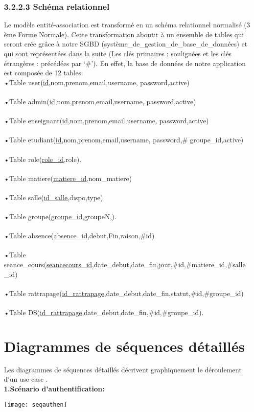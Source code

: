\documentclass[a4paper,12pt,oneside]{report}
\begin{document}
\subsubsection{3.2.2.3 Schéma relationnel}
Le modèle entité-association est transformé en un schéma relationnel normalisé (3 ème Forme Normale).
Cette transformation aboutit à un ensemble de tables qui seront crée grâce à notre SGBD (système\_de\_gestion\_de\_base\_de\_données) et qui sont représentées dans la suite (Les clés primaires : soulignées et les clés étrangères : précédées par ‘\#’). En effet, la base de données de notre application est composée de 12 tables:
\\
•Table user(\underline{id},nom,prenom,email,username, 
password,active)\\
\\
•Table admin(\underline{id},nom,prenom,email,username, 
password,active)\\
\\
•Table enseignant(\underline{id},nom,prenom,email,username, 
password,active)\\
\\
•Table etudiant(\underline{id},nom,prenom,email,username, 
password,\# groupe\_id,active) \\
\\
•Table role(\underline{role\_id},role).\\ \\
•Table matiere(\underline{matiere\_id},nom\_matiere)\\
\\
•Table salle(\underline{id\_salle},dispo,type)\\
\\
•Table groupe(\underline{groupe\_id},groupeN,).\\
\\
•Table absence(\underline{absence\_id},debut,Fin,raison,\#id)\\
\\
•Table seance\_cours(\underline{seancecours\_id},date\_debut,date\_fin,jour,\#id,\#matiere\_id,\#salle\_id)\\
\\
•Table rattrapage(\underline{id\_rattrapage},date\_debut,date\_fin,statut,\#id,\#groupe\_id)\\
\\
•Table DS(\underline{id\_rattrapage},date\_debut,date\_fin,\#id,\#groupe\_id).\\
\section{Diagrammes de séquences détaillés}
 Les diagrammes de séquences détaillés décrivent graphiquement le déroulement d'un use case .\\
 \textbf{1.Scénario d'authentification:}
 \begin{center}
\texttt{[image: seqauthen]}

\label{fig1}
\end{center}
\end{document}

